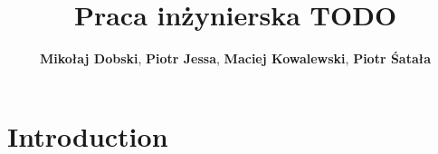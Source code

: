 \documentclass[a4paper,10pt]{report}
\title{\textbf{Praca inżynierska TODO}}
\author{\textbf{Mikołaj Dobski}, \textbf{Piotr Jessa}, \textbf{Maciej Kowalewski}, \textbf{Piotr Śatała}}
\date{}
\begin{document}
\maketitle

\tableofcontents

\newpage

\chapter{Introduction}
%



\end{document}
